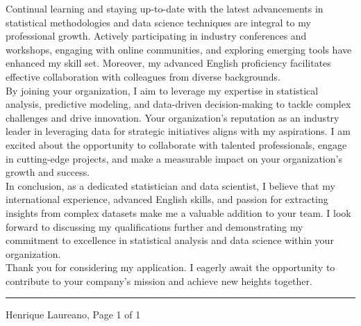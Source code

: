 \documentclass[12pt]{article}
\newcommand{\horrule}[1]{\noindent\rule{\linewidth}{#1}}
\begin{document}
Continual learning and staying up-to-date with the latest advancements in 
statistical methodologies and data science techniques are integral to my 
professional growth. Actively participating in industry conferences and 
workshops, engaging with online communities, and exploring emerging tools have 
enhanced my skill set. Moreover, my advanced English proficiency facilitates 
effective collaboration with colleagues from diverse backgrounds.\\

By joining your organization, I aim to leverage my expertise in statistical 
analysis, predictive modeling, and data-driven decision-making to tackle
complex challenges and drive innovation. Your organization's reputation as an
industry leader in leveraging data for strategic initiatives aligns with my
aspirations. I am excited about the opportunity to collaborate with talented
professionals, engage in cutting-edge projects, and make a measurable impact on
your organization's growth and success.\\

In conclusion, as a dedicated statistician and data scientist, I believe that
my international experience, advanced English skills, and passion for
extracting insights from complex datasets make me a valuable addition to your
team. I look forward to discussing my qualifications further and demonstrating
my commitment to excellence in statistical analysis and data science within
your organization.\\

Thank you for considering my application. I eagerly await the opportunity to 
contribute to your company's mission and achieve new heights together.

\vspace{\fill}
\horrule{1pt}
\noindent Henrique Laureano, \hfill Page 1 of 1
\end{document}
